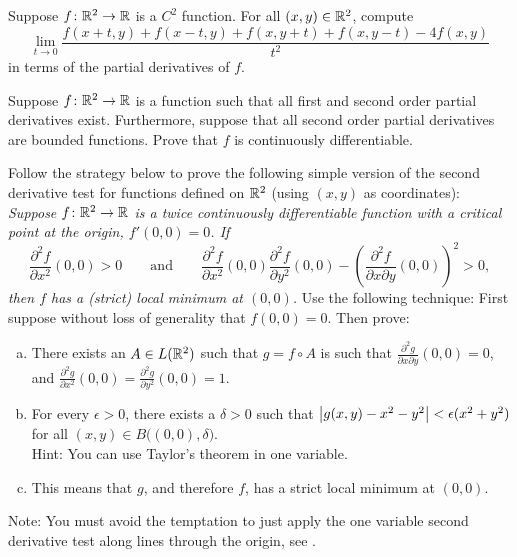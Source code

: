 \begin{exercise}
Suppose $f \colon {\mathbb{R}}^2 \to {\mathbb{R}}$ is a $C^2$ function.
For all $(x,y) \in {\mathbb{R}}^2$, compute
\begin{equation*}
\lim_{t \to 0}
\frac{f(x+t,y)+f(x-t,y)+f(x,y+t)+f(x,y-t) - 4f(x,y)}{t^2}
\end{equation*}
in terms of the partial derivatives of $f$.
\end{exercise}

\begin{exercise}
Suppose $f \colon {\mathbb{R}}^2 \to {\mathbb{R}}$ is a function such that
all first and second order partial derivatives exist.  Furthermore,
suppose that all second order partial derivatives are bounded functions.
Prove that $f$ is continuously differentiable.
\end{exercise}

\begin{samepage}
\begin{exercise}
Follow the strategy below to
prove the following simple version of the second derivative test for
functions defined on ${\mathbb{R}}^2$ (using $(x,y)$ as coordinates):  \emph{Suppose $f \colon {\mathbb{R}}^2
\to {\mathbb{R}}$ is a twice continuously differentiable function with a
critical point at the origin, $f'(0,0) = 0$.  If
\begin{equation*}
\frac{\partial^2 f}{\partial x^2} (0,0) > 0 \qquad \text{and} \qquad
\frac{\partial^2 f}{\partial x^2} (0,0) \frac{\partial^2 f}{\partial y^2}
(0,0) -
{\left(\frac{\partial^2 f}{\partial x \partial y} (0,0) \right)}^2 > 0 ,
\end{equation*}
then $f$ has a (strict) local minimum at $(0,0)$.}
Use the following technique:  First suppose without loss of generality
that $f(0,0) = 0$.  Then prove:
\begin{enumerate}[a)]
\item
There exists an $A \in L({\mathbb{R}}^2)$ such that $g = f \circ A$ is
such that $\frac{\partial^2 g}{\partial x \partial y} (0,0) = 0$, and
$\frac{\partial^2 g}{\partial x^2} (0,0) =
\frac{\partial^2 g}{\partial y^2} (0,0) = 1$.
\item
For every $\epsilon > 0$, there exists a $\delta > 0$
such that 
$\left\lvert {g(x,y) - x^2 - y^2} \right\rvert < \epsilon (x^2+y^2)$ for all
$(x,y) \in B\bigl((0,0),\delta\bigr)$.\\
Hint: You can use Taylor's theorem in one variable.
\item
This means that $g$, and therefore $f$, has a strict local
minimum at $(0,0)$.
\end{enumerate}
Note: You must avoid the temptation to just
apply the one variable second derivative test along lines through the
origin, see .
\end{exercise}
\end{samepage}
